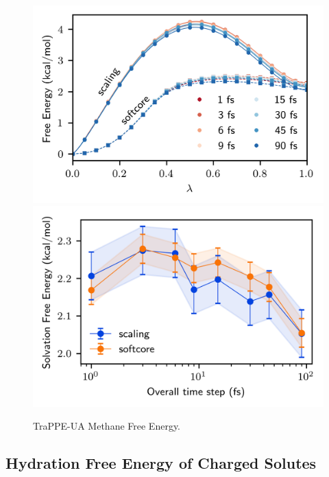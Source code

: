 \documentclass[
aip,
jcp,
reprint,
]{revtex4-1}
\begin{document}
\begin{figure}
	\centering
	\includegraphics{trappe_methane_vdw_free_energy_profiles}
	\includegraphics{trappe_methane_vdw_free_energies}
	\caption{TraPPE-UA Methane Free Energy.}
	\label{fig:methane free energy}
\end{figure}

\subsection{Hydration Free Energy of Charged Solutes}
\end{document}
